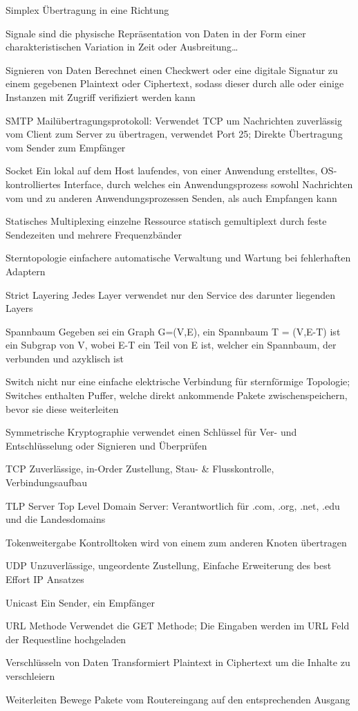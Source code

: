 \documentclass[a4paper]{article}
\begin{document}
\begin{multicols}{3}
\begin{description*}
        \item[Simplex] Übertragung in eine Richtung
        \item[Signale] sind die physische Repräsentation von Daten in der Form einer charakteristischen Variation in Zeit oder Ausbreitung…
        \item[Signieren von Daten] Berechnet einen Checkwert oder eine digitale Signatur zu einem gegebenen Plaintext oder Ciphertext, sodass dieser durch alle oder einige Instanzen mit Zugriff verifiziert werden kann
        \item[SMTP] Mailübertragungsprotokoll: Verwendet TCP um Nachrichten zuverlässig vom Client zum Server zu übertragen, verwendet Port 25; Direkte Übertragung vom Sender zum Empfänger
        \item[Socket] Ein lokal auf dem Host laufendes, von einer Anwendung erstelltes, OS-kontrolliertes Interface, durch welches ein Anwendungsprozess sowohl Nachrichten vom und zu anderen Anwendungsprozessen Senden, als auch Empfangen kann
        \item[Statisches Multiplexing] einzelne Ressource statisch gemultiplext durch feste Sendezeiten und mehrere Frequenzbänder
        \item[Sterntopologie] einfachere automatische Verwaltung und Wartung bei fehlerhaften Adaptern
        \item[Strict Layering] Jedes Layer verwendet nur den Service des darunter liegenden Layers
        \item[Spannbaum] Gegeben sei ein Graph G=(V,E), ein Spannbaum T = (V,E-T) ist ein Subgrap von V, wobei E-T ein Teil von E ist, welcher ein Spannbaum, der verbunden und azyklisch ist
        \item[Switch] nicht nur eine einfache elektrische Verbindung für sternförmige Topologie; Switches enthalten Puffer, welche direkt ankommende Pakete zwischenspeichern, bevor sie diese weiterleiten
        \item[Symmetrische Kryptographie] verwendet einen Schlüssel für Ver- und Entschlüsselung oder Signieren und Überprüfen
        \item[TCP] Zuverlässige, in-Order Zustellung, Stau- \& Flusskontrolle, Verbindungsaufbau
        \item[TLP Server] Top Level Domain Server: Verantwortlich für .com, .org, .net, .edu und die Landesdomains
        \item[Tokenweitergabe] Kontrolltoken wird von einem zum anderen Knoten übertragen
        \item[UDP] Unzuverlässige, ungeordente Zustellung, Einfache Erweiterung des best Effort IP Ansatzes
        \item[Unicast] Ein Sender, ein Empfänger
        \item[URL Methode] Verwendet die GET Methode; Die Eingaben werden im URL Feld der Requestline hochgeladen
        \item[Verschlüsseln von Daten] Transformiert Plaintext in Ciphertext um die Inhalte zu verschleiern
        \item[Weiterleiten] Bewege Pakete vom Routereingang auf den entsprechenden Ausgang
    \end{description*}
    

\end{multicols}
\end{document}
